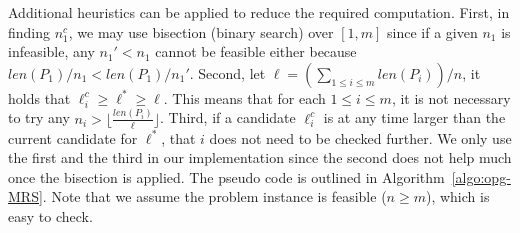 
Additional heuristics can be applied to reduce the required computation. 
First, in finding $n_1^c$, we may use bisection (binary search) over 
$[1, m]$ since if a given $n_1$ is infeasible, any $n_1' < n_1$ cannot 
be feasible either because $len(P_1)/n_1 < len(P_1)/n_1'$. Second, let 
$\ell = (\sum_{1\le i\le m}len(P_i))/n$, it holds that $\ell_i^c \ge 
\ell^* \ge \ell$. This means that for each $1 \le i \le m$, it is not 
necessary to try any $n_i > \lfloor \frac{len(P_i)}{\ell} \rfloor$. 
Third, if a candidate $\ell_i^c$ is at any time larger than the current 
candidate for $\ell^*$, that $i$ does not need to be checked further. 
We only use the first and the third in our implementation since the 
second does not help much once the bisection is applied. The 
pseudo code is outlined in Algorithm~\ref{algo:opg-MRS}. Note that we 
assume the problem instance is feasible ($n \ge m$), which is easy to check. 

